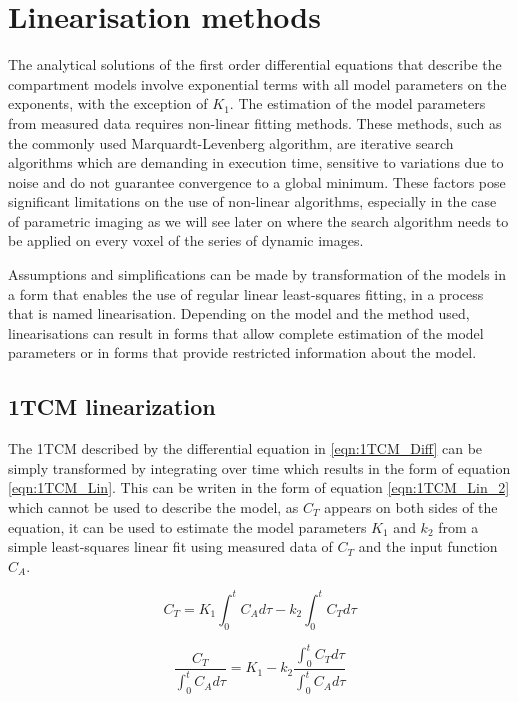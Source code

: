 \section{Linearisation methods}
The analytical solutions of the first order differential equations that describe the compartment models involve exponential terms with all model parameters on the exponents, with the exception of $K_1$. The estimation of the model parameters from measured data requires non-linear fitting methods. These methods, such as the commonly used Marquardt-Levenberg algorithm, are iterative search algorithms which are demanding in execution time, sensitive to variations due to noise and do not guarantee convergence to a global minimum. These factors pose significant limitations on the use of non-linear algorithms, especially in the case of parametric imaging as we will see later on where the search algorithm needs to be applied on every voxel of the series of dynamic images.\par
Assumptions and simplifications can be made by transformation of the models in a form that enables the use of regular linear least-squares fitting, in a process that is named linearisation. Depending on the model and the method used, linearisations can result in forms that allow complete estimation of the model parameters or in forms that provide restricted information about the model. 

\subsection{1TCM linearization}
The 1TCM described by the differential equation in \ref{eqn:1TCM_Diff} can be simply transformed by integrating over time which results in the form of equation \ref{eqn:1TCM_Lin}. This can be writen in the form of equation \ref{eqn:1TCM_Lin_2} which cannot be used to describe the model, as $C_T$ appears on both sides of the equation, it can be used to estimate the model parameters $K_1$ and $k_2$ from a simple least-squares linear fit using measured data of $C_T$ and the input function $C_A$. 

\begin{equation}
C_T = K_1 \int_{0}^{t} C_A d\tau  - k_2 \int_{0}^{t} C_T d\tau
\label{eqn:1TCM_Lin}
\end{equation}

\begin{equation}
\frac{C_T}{\int_{0}^{t} C_A d\tau} = K_1 - k_2 \frac{\int_{0}^{t} C_T d\tau}{\int_{0}^{t} C_A d\tau} 
\label{eqn:1TCM_Lin_2}
\end{equation}

